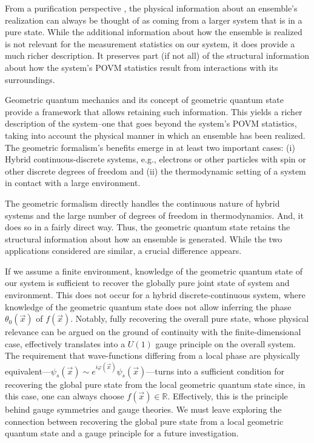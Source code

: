 \documentclass[draft,nofootinbib,pre,twocolumn,showpacs,showkeys,preprintnumbers,floatfix]{revtex4-1}
\newcommand{\1}{\mathbbm{1}}
\begin{document}
From a purification perspective \cite{Wilde2017}, the physical information
about an ensemble's realization can always be thought of as coming from a
larger system that is in a pure state. While the additional information about
how the ensemble is realized is not relevant for the measurement statistics on
our system, it does provide a much richer description. It preserves part (if
not all) of the structural information about how the system's POVM statistics
result from interactions with its surroundings.
 
Geometric quantum mechanics and its concept of geometric quantum state provide
a framework that allows retaining such information. This yields a richer
description of the system--one that goes beyond the system's POVM statistics, 
taking into account the physical manner in which an ensemble has been realized.
The geometric formalism's benefits emerge in at least two important cases:
(i) Hybrid continuous-discrete systems, e.g., electrons or other particles with
spin or other discrete degrees of freedom and (ii) the thermodynamic setting
of a system in contact with a large environment.

The geometric formalism directly handles the continuous nature of hybrid
systems and the large number of degrees of freedom in thermodynamics. And, it
does so in a fairly direct way. Thus, the geometric quantum state retains the 
structural information about how an ensemble is generated. While the 
two applications considered are similar, a crucial difference appears.

If we assume a finite environment, knowledge of the geometric quantum state of
our system is sufficient to recover the globally pure joint state of system and
environment. This does not occur for a hybrid discrete-continuous system, where
knowledge of the geometric quantum state does not allow inferring the phase
$\theta_0(\vec{x})$ of $f(\vec{x})$. Notably, fully recovering the overall pure
state, whose physical relevance can be argued on the ground of continuity with
the finite-dimensional case, effectively translates into a $U(1)$ gauge
principle on the overall system. The requirement that wave-functions differing 
from a local phase are physically equivalent---$\psi_s(\vec{x}) \sim
e^{i\varphi(\vec{x})}\psi_s(\vec{x})$---turns into a sufficient condition for
recovering the global pure state from the local geometric quantum state since, 
in this case, one can always choose $f(\vec{x}) \in \mathbb{R}$. Effectively, this is
the principle behind gauge symmetries and gauge theories. We must leave
exploring the connection between recovering the global pure state from a local
geometric quantum state and a gauge principle for a future investigation.
\end{document}

